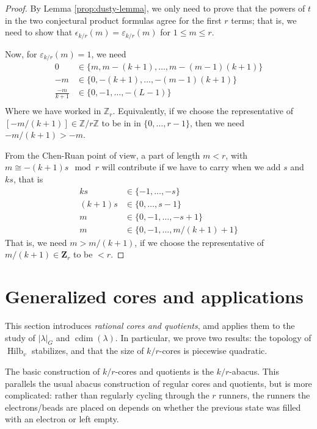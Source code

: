 \documentclass{amsart}[12pt]
\theoremstyle{definition}
\newcommand{\Z}{\mathbf{Z}}
\DeclareMathOperator{\Hilb}{Hilb}
\DeclareMathOperator{\cdim}{cdim}
\begin{document}
\begin{proof}
By Lemma \ref{prop:dusty-lemma}, we only need to prove that the powers of $t$ in the two conjectural product formulas agree for the first $r$ terms; that is, we need to show that $\epsilon_{k/r}(m)=\varepsilon_{k/r}(m)$ for $1\leq m\leq r$.  

Now, for $\varepsilon_{k/r}(m)=1$, we need 
\begin{align*}
0 &\in \{m, m-(k+1),\dots, m-(m-1)(k+1) \} \\
-m &\in \{0, -(k+1),\dots,-(m-1)(k+1) \} \\
\frac{-m}{k+1} &\in \{0, -1, \dots, -(L-1) \} \\
\end{align*}
Where we have worked in $\mathbb{Z}_r$.  Equivalently, if we choose the representative of $[-m/(k+1)]\in \mathbb{Z}/r\mathbb{Z}$ to be in in $\{0,\dots, r-1\}$, then we need $-m/(k+1)>-m$.

From the Chen-Ruan point of view, a part of length $m<r$, with $ m\cong-(k+1)s\mod r$ will contribute if we have to carry when we add $s$ and $ks$, that is 
\begin{align*}
k s &\in\{ -1,\dots, -s \}\\
(k+1)s &\in\{ 0,\dots, s-1\} \\
m&\in\{ 0,-1,\dots, -s+1\} \\
m& \in \{0, -1,\dots, m/(k+1)+1\}
\end{align*}
That is, we need $m>m/(k+1)$, if we choose the representative of $m/(k+1)\in\Z_r$ to be $<r$.

\end{proof}


\section{Generalized cores and applications}

This section introduces \emph{rational cores and quotients}, amd applies them to the study of $|\lambda|_G$ and $\cdim(\lambda)$.  In particular, we prove two results: the topology of $\Hilb_v$ stabilizes, and that the size of $k/r$-cores is piecewise quadratic.

The basic construction of $k/r$-cores and quotients is the $k/r$-abacus.  This parallels the usual abacus construction of regular cores and quotients, but is more complicated: rather than regularly cycling through the $r$ runners, the runners the electrons/beads are placed on depends on whether the previous state was filled with an electron or left empty.  
\end{document}
